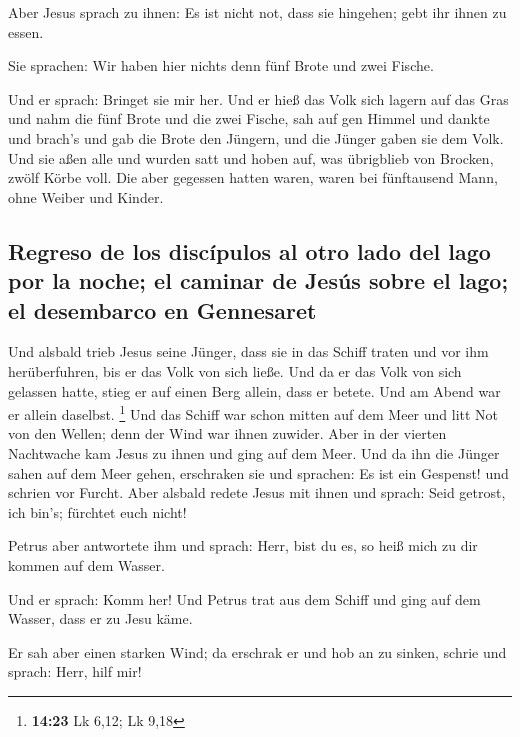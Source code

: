  Aber Jesus sprach zu ihnen: Es ist nicht not, dass sie
hingehen; gebt ihr ihnen zu essen.

 Sie sprachen: Wir haben hier nichts denn fünf Brote und
zwei Fische.

 Und er sprach: Bringet sie mir her.  Und
er hieß das Volk sich lagern auf das Gras und nahm die fünf Brote und
die zwei Fische, sah auf gen Himmel und dankte und brach's und gab die
Brote den Jüngern, und die Jünger gaben sie dem Volk. 
Und sie aßen alle und wurden satt und hoben auf, was übrigblieb von
Brocken, zwölf Körbe voll.  Die aber gegessen hatten
waren, waren bei fünftausend Mann, ohne Weiber und Kinder.

\hypertarget{regreso-de-los-discuxedpulos-al-otro-lado-del-lago-por-la-noche-el-caminar-de-jesuxfas-sobre-el-lago-el-desembarco-en-gennesaret}{%
\subsection{Regreso de los discípulos al otro lado del lago por la
noche; el caminar de Jesús sobre el lago; el desembarco en
Gennesaret}\label{regreso-de-los-discuxedpulos-al-otro-lado-del-lago-por-la-noche-el-caminar-de-jesuxfas-sobre-el-lago-el-desembarco-en-gennesaret}}

 Und alsbald trieb Jesus seine Jünger, dass sie in das
Schiff traten und vor ihm herüberfuhren, bis er das Volk von sich ließe.
 Und da er das Volk von sich gelassen hatte, stieg er auf
einen Berg allein, dass er betete. Und am Abend war er allein daselbst.
\footnote{\textbf{14:23} Lk 6,12; Lk 9,18}  Und das
Schiff war schon mitten auf dem Meer und litt Not von den Wellen; denn
der Wind war ihnen zuwider.  Aber in der vierten
Nachtwache kam Jesus zu ihnen und ging auf dem Meer.  Und
da ihn die Jünger sahen auf dem Meer gehen, erschraken sie und sprachen:
Es ist ein Gespenst! und schrien vor Furcht.  Aber
alsbald redete Jesus mit ihnen und sprach: Seid getrost, ich bin's;
fürchtet euch nicht!

 Petrus aber antwortete ihm und sprach: Herr, bist du es,
so heiß mich zu dir kommen auf dem Wasser.

 Und er sprach: Komm her! Und Petrus trat aus dem Schiff
und ging auf dem Wasser, dass er zu Jesu käme.

 Er sah aber einen starken Wind; da erschrak er und hob
an zu sinken, schrie und sprach: Herr, hilf mir!

